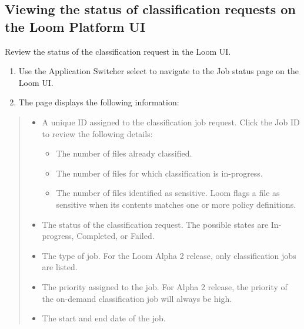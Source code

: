 \documentclass[letterpaper,10pt,english]{sphinxmanual}
\begin{document}
\subsection{Viewing the status of classification requests on the Loom Platform UI}
\label{\detokenize{mcdmp_app_ug:viewing-the-status-of-classification-requests-on-the-loom-platform-ui}}
Review the status of the classification request in the Loom UI.

\begin{enumerate}
\item {} 
Use the Application Switcher select  to navigate to the Job status page on the Loom UI.

\item {} 
The  page displays the following information:

\end{enumerate}
\begin{quote}
\begin{itemize}
\item {} 
A unique ID assigned to the classification job request. Click the Job ID to review the following details:
\begin{itemize}
\item {} 
The number of files already classified.

\item {} 
The number of files for which classification is in-progress.

\item {} 
The number of files identified as sensitive. Loom flags a file as sensitive when its contents matches one or more policy definitions.

\end{itemize}

\item {} 
The status of the classification request. The possible states are In-progress, Completed, or Failed.

\item {} 
The type of job. For the Loom Alpha 2 release, only classification jobs are listed.

\item {} 
The priority assigned to the job. For Alpha 2 release, the priority of the on-demand classification job will always be high.

\item {} 
The start and end date of the job.

\end{itemize}
\end{quote}
\end{document}
